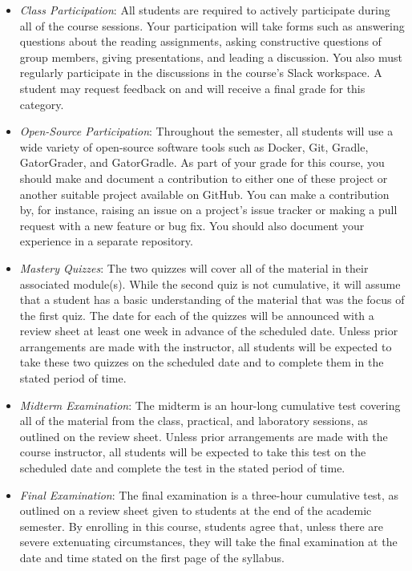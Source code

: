 \documentclass[11pt]{article}
\begin{document}
\begin{itemize}

  \item {\em Class Participation\/}: All students are required to actively
    participate during all of the course sessions. Your participation will take
    forms such as answering questions about the reading assignments, asking
    constructive questions of group members, giving presentations, and leading a
    discussion. You also must regularly participate in the discussions in the
    course's Slack workspace. A student may request feedback on and will receive a
    final grade for this category.

  \item {\em Open-Source Participation\/}: Throughout the semester, all students
    will use a wide variety of open-source software tools such as Docker, Git,
    Gradle, GatorGrader, and GatorGradle. As part of your grade for this course,
    you should make and document a contribution to either one of these project
    or another suitable project available on GitHub. You can make a contribution
    by, for instance, raising an issue on a project's issue tracker or making a
    pull request with a new feature or bug fix. You should also document your
    experience in a separate repository.

  \item {\em Mastery Quizzes\/}: The two quizzes will cover all of the material
    in their associated module(s). While the second quiz is not cumulative, it
    will assume that a student has a basic understanding of the material that
    was the focus of the first quiz. The date for each of the quizzes will be
    announced with a review sheet at least one week in advance of the scheduled
    date. Unless prior arrangements are made with the instructor, all students
    will be expected to take these two quizzes on the scheduled date and to
    complete them in the stated period of time.

  \item {\em Midterm Examination\/}: The midterm is an hour-long cumulative test
    covering all of the material from the class, practical, and laboratory
    sessions, as outlined on the review sheet. Unless prior arrangements are
    made with the course instructor, all students will be expected to take this
    test on the scheduled date and complete the test in the stated period of
    time.

  \item {\em Final Examination\/}: The final examination is a three-hour
    cumulative test, as outlined on a review sheet given to students at the end
    of the academic semester. By enrolling in this course, students agree that,
    unless there are severe extenuating circumstances, they will take the final
    examination at the date and time stated on the first page of the syllabus.


\end{itemize}
\end{document}
